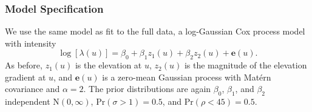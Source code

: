 \documentclass[]{interact}
\begin{document}
\subsubsection{Model Specification}

We use the same model as fit to the full data, a log-Gaussian Cox process model
with intensity
\begin{displaymath}
\log\left[\lambda(u)\right] = \beta_{0} + \beta_{1} z_{1}(u)
+ \beta_{2} z_{2}(u) + \mathbf{e}(u).
\end{displaymath}
As before, \(z_{1}(u)\) is the elevation at \(u\), \(z_{2}(u)\) is the
magnitude of the elevation gradient at \(u\), and \(\mathbf{e}(u)\) is a
zero-mean Gaussian process with Mat\'{e}rn covariance and \(\alpha = 2\).
The prior distributions are again \(\beta_{0}\), \(\beta_{1}\), and
\(\beta_{2}\) independent \(\mathrm{N}(0, \infty)\),
\(\mathrm{Pr}(\sigma > 1) = 0.5\), and \(\mathrm{Pr}(\rho < 45) = 0.5\).
\end{document}
